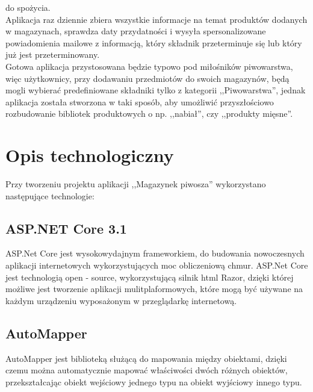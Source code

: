 \documentclass[12pt,a4paper]{article}
\begin{document}
			do spożycia.\\
		\indent Aplikacja raz dziennie zbiera wszystkie informacje na temat produktów dodanych w magazynach, sprawdza daty przydatności i wysyła spersonalizowane powiadomienia
			mailowe z informacją, który składnik przeterminuje się lub który już jest przeterminowany.\\
		\indent Gotowa aplikacja przystosowana będzie typowo pod miłośników piwowarstwa, więc użytkownicy, przy dodawaniu przedmiotów do swoich magazynów, będą mogli wybierać
			predefiniowane składniki tylko z kategorii ,,Piwowarstwa'', jednak aplikacja została stworzona w taki sposób, aby umożliwić przyszłościowo rozbudowanie
			bibliotek produktowych o np. ,,nabiał'', czy ,,produkty mięsne''.
	\newpage

	\section{Opis technologiczny}
		\indent Przy tworzeniu projektu aplikacji ,,Magazynek piwosza'' wykorzystano następujące technologie:

		\subsection{ASP.NET Core 3.1}
			\indent ASP.Net Core jest wysokowydajnym frameworkiem, do budowania nowoczesnych aplikacji internetowych wykorzystujących moc obliczeniową chmur. ASP.Net Core jest technologią
			open - source, wykorzystującą silnik html Razor, dzięki której możliwe jest tworzenie aplikacji mulitplaformowych, które mogą być używane na każdym urządzeniu wyposażonym
			w przeglądarkę internetową.

		\subsection{AutoMapper}
			\indent AutoMapper jest biblioteką służącą do mapowania między obiektami, dzięki czemu można automatycznie mapować właściwości dwóch różnych obiektów,
					przekształcając obiekt wejściowy jednego typu na obiekt wyjściowy innego typu.  
\end{document}
